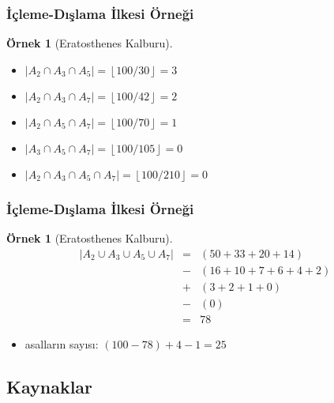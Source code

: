 \documentclass[dvipsnames]{beamer}
\theoremstyle{definition}
\theoremstyle{example}
\newtheorem{ornek}[theorem]{Örnek}
\theoremstyle{plain}
\begin{document}
\begin{frame}
  \frametitle{İçleme-Dışlama İlkesi Örneği}

  \begin{ornek}[Eratosthenes Kalburu]
    \begin{itemize}
      \item $|A_2 \cap A_3 \cap A_5| = \left\lfloor 100/30  \right\rfloor = 3$
      \item $|A_2 \cap A_3 \cap A_7| = \left\lfloor 100/42  \right\rfloor = 2$
      \item $|A_2 \cap A_5 \cap A_7| = \left\lfloor 100/70  \right\rfloor = 1$
      \item $|A_3 \cap A_5 \cap A_7| = \left\lfloor 100/105 \right\rfloor = 0$
    \end{itemize}

    \pause
    \begin{itemize}
      \item $|A_2 \cap A_3 \cap A_5 \cap A_7| = \left\lfloor 100/210 \right\rfloor = 0$
    \end{itemize}
  \end{ornek}
\end{frame}

\begin{frame}
  \frametitle{İçleme-Dışlama İlkesi Örneği}

  \begin{ornek}[Eratosthenes Kalburu]
    \begin{eqnarray*}
      |A_2 \cup A_3 \cup A_5 \cup A_7| & = & (50 + 33 + 20 +14)\\
                                       & - & (16 + 10 + 7 + 6 + 4 + 2)\\
                                       & + & (3 + 2 + 1 + 0)\\
                                       & - & (0)\\
                                       & = & 78
    \end{eqnarray*}

    \pause
    \begin{itemize}
      \item asalların sayısı: $(100 - 78) + 4 - 1 = 25$
    \end{itemize}
  \end{ornek}
\end{frame}

\subsection*{Kaynaklar}
\end{document}
